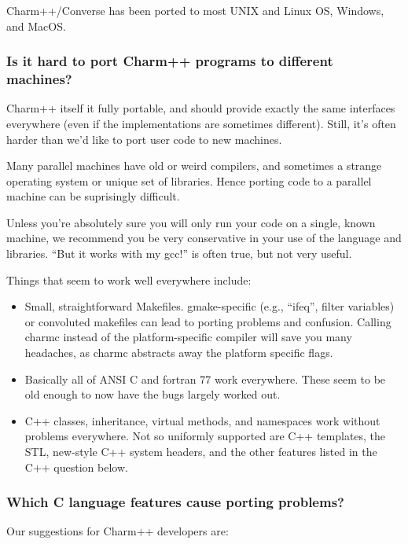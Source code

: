 Charm++/Converse has been ported to most UNIX and Linux OS, Windows, and MacOS.

\subsubsection{Is it hard to port Charm++ programs to different machines?}

\label{porting}
Charm++ itself it fully portable, and should provide exactly 
the same interfaces everywhere (even if the implementations are 
sometimes different).  Still, it's often harder than we'd like
to port user code to new machines.

Many parallel machines have old or weird compilers, and 
sometimes a strange operating system or unique set of libraries.  
Hence porting code to a parallel machine can be suprisingly difficult.

Unless you're absolutely sure you will only run your code on a
single, known machine, we recommend you be very conservative in 
your use of the language and libraries.  ``But it works with my gcc!''
is often true, but not very useful.

Things that seem to work well everywhere include:
\begin{itemize}
\item Small, straightforward Makefiles.  gmake-specific (e.g.,
``ifeq'', filter variables) or convoluted makefiles can lead 
to porting problems and confusion.  Calling charmc instead
of the platform-specific compiler will save you many headaches,
as charmc abstracts away the platform specific flags.
\item Basically all of ANSI C and fortran 77 work everywhere.  These seem 
to be old enough to now have the bugs largely worked out.
\item C++ classes, inheritance, virtual methods, and namespaces
work without problems everywhere.  Not so uniformly supported 
are C++ templates, the STL, new-style C++ system headers, 
and the other features listed in the C++ question below.
\end{itemize}

\subsubsection{Which C language features cause porting problems?}

Our suggestions for Charm++ developers are:

